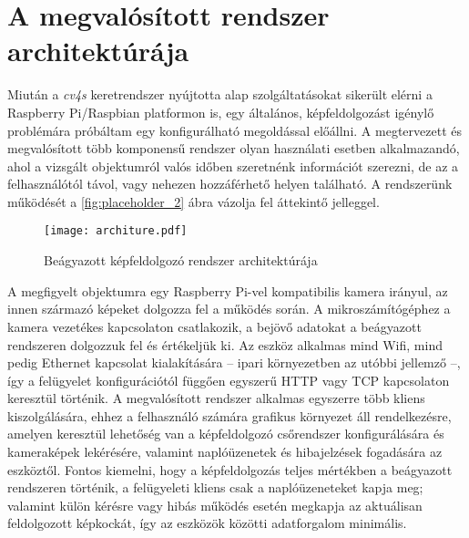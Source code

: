 \section{A megvalósított rendszer architektúrája} \label{architektura}

Miután a \emph{cv4s} keretrendszer nyújtotta alap szolgáltatásokat sikerült elérni a Raspberry Pi/Raspbian platformon is, egy általános, képfeldolgozást igénylő problémára próbáltam egy konfigurálható megoldással előállni. A megtervezett és megvalósított több komponensű rendszer olyan használati esetben alkalmazandó, ahol a vizsgált objektumról valós időben szeretnénk információt szerezni, de az a felhasználótól távol, vagy nehezen hozzáférhető helyen található. A rendszerünk működését a \ref{fig:placeholder_2} ábra vázolja fel áttekintő jelleggel.

\begin{figure}[h]
\texttt{[image: architure.pdf]}
\centering
\caption{Beágyazott képfeldolgozó rendszer architektúrája}
\label{fig:architekture}
\end{figure}

A megfigyelt objektumra egy Raspberry Pi-vel kompatibilis kamera irányul, az innen származó képeket dolgozza fel a működés során. A mikroszámítógéphez a kamera vezetékes kapcsolaton csatlakozik, a bejövő adatokat a beágyazott rendszeren dolgozzuk fel és értékeljük ki. Az eszköz alkalmas mind Wifi, mind pedig Ethernet kapcsolat kialakítására -- ipari környezetben az utóbbi jellemző --, így a felügyelet konfigurációtól függően egyszerű HTTP vagy TCP kapcsolaton keresztül történik. A megvalósított rendszer alkalmas egyszerre több kliens kiszolgálására, ehhez a felhasználó számára grafikus környezet áll rendelkezésre, amelyen keresztül lehetőség van a képfeldolgozó csőrendszer konfigurálására és kameraképek lekérésére, valamint naplóüzenetek és hibajelzések fogadására az eszköztől. Fontos kiemelni, hogy a képfeldolgozás teljes mértékben a beágyazott rendszeren történik, a felügyeleti kliens csak a naplóüzeneteket kapja meg; valamint külön kérésre vagy hibás működés esetén megkapja az aktuálisan feldolgozott képkockát, így az eszközök közötti adatforgalom minimális.
